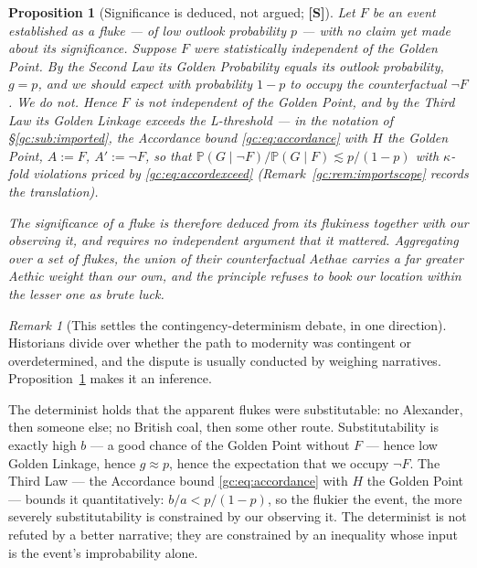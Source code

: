 \documentclass[11pt]{article}
\numberwithin{equation}{section}
\theoremstyle{plain}
\newtheorem{proposition}[theorem]{Proposition}
\theoremstyle{definition}
\theoremstyle{remark}
\newtheorem{remark}[theorem]{Remark}
\newcommand{\PP}{\mathbb{P}}
\begin{document}
\begin{proposition}[Significance is deduced, not argued; \textbf{[S]}]
\label{gc:prop:flukes}
Let $F$ be an event established as a \emph{fluke} --- of low outlook
probability $p$ --- with no claim yet made about its significance.
Suppose $F$ were statistically independent of the Golden Point. By the
Second Law its Golden Probability equals its outlook probability, $g=p$,
and we should expect with probability $1-p$ to occupy the counterfactual
$\neg F$. We do not. Hence $F$ is not independent of the Golden Point,
and by the Third Law its Golden Linkage exceeds the L-threshold
\cite{Nexus, GoldenScience22} --- in the notation of
\S\ref{gc:sub:imported}, the Accordance bound \eqref{gc:eq:accordance}
with $H$ the Golden Point, $A:=F$, $A':=\neg F$, so that
$\PP(G\mid\neg F)/\PP(G\mid F)\lesssim p/(1-p)$ with $\kappa$-fold
violations priced by \eqref{gc:eq:accordexceed}
(Remark~\ref{gc:rem:importscope} records the translation).

The significance of a fluke is therefore \emph{deduced from its
flukiness together with our observing it}, and requires no independent
argument that it mattered. Aggregating over a set of flukes, the union
of their counterfactual Aethae carries a far greater Aethic weight than
our own, and the principle refuses to book our location within the
lesser one as brute luck.
\end{proposition}

\begin{remark}[This settles the contingency-determinism debate, in one
direction]\label{gc:rem:determinism}
Historians divide over whether the path to modernity was contingent or
overdetermined, and the dispute is usually conducted by weighing
narratives. Proposition~\ref{gc:prop:flukes} makes it an inference.

The determinist holds that the apparent flukes were substitutable: no
Alexander, then someone else; no British coal, then some other route.
Substitutability is exactly high $b$ --- a good chance of the Golden
Point without $F$ --- hence low Golden Linkage, hence $g \approx p$,
hence the expectation that we occupy $\neg F$. The Third Law --- the
Accordance bound \eqref{gc:eq:accordance} with $H$ the Golden Point ---
bounds it quantitatively: $b/a < p/(1-p)$, so the flukier the event, the more
severely substitutability is constrained by our observing it. The
determinist is not refuted by a better narrative; they are constrained
by an inequality whose input is the event's improbability alone.
\end{remark}
\end{document}
